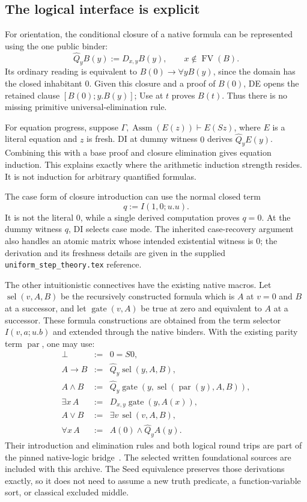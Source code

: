 \documentclass[11pt,letterpaper]{article}
\newcommand{\file}[1]{\nolinkurl{#1}}
\begin{document}
\subsection{The logical interface is explicit}

For orientation, the conditional closure of a native formula can be
represented using the one public binder:
\[
 \widehat Q_y B(y):=D_{x,y}B(y),\qquad x\notin\operatorname{FV}(B).
\]
Its ordinary reading is equivalent to $B(0)\to\forall y B(y)$, since the
domain has the closed inhabitant $0$. Given this closure and a proof of
$B(0)$, DE opens the retained clause $[B(0);y.B(y)]$; Use at $t$ proves
$B(t)$. Thus there is no missing primitive universal-elimination rule.

For equation progress, suppose
$\Gamma,\operatorname{Assm}(E(z))\vdash E(Sz)$, where $E$ is a literal
equation and $z$ is fresh. DI at dummy witness $0$ derives
$\widehat Q_y E(y)$. Combining this with a base proof and closure
elimination gives equation induction. This explains exactly where the
arithmetic induction strength resides. It is not induction for arbitrary
quantified formulas.

The case form of closure introduction can use the normal closed term
\[
 q:=I(1,0;u.u).
\]
It is not the literal $0$, while a single derived computation proves
$q=0$. At the dummy witness $q$, DI selects case mode. The inherited
case-recovery argument also handles an atomic matrix whose intended
existential witness is $0$; the derivation and its freshness details are
given in the supplied \file{uniform_step_theory.tex} reference.

The other intuitionistic connectives have the existing native macros.
Let $\operatorname{sel}(v,A,B)$ be the recursively constructed formula
which is $A$ at $v=0$ and $B$ at a successor, and let
$\operatorname{gate}(v,A)$ be true at zero and equivalent to $A$ at a
successor. These formula constructions are obtained from the term
selector $I(v,a;u.b)$ and extended through the native binders. With the
existing parity term $\operatorname{par}$, one may use:
\[
\begin{array}{rcl}
 \bot&:=&0=S0,\\
 A\to B&:=&\widehat Q_y\operatorname{sel}(y,A,B),\\
 A\land B&:=&\widehat Q_y\operatorname{gate}
                  (y,\operatorname{sel}(\operatorname{par}(y),A,B)),\\
 \exists x\,A&:=&D_{x,y}\operatorname{gate}(y,A(x)),\\
 A\lor B&:=&\exists v\,\operatorname{sel}(v,A,B),\\
 \forall x\,A&:=&A(0)\land\widehat Q_y A(y).
\end{array}
\]
Their introduction and elimination rules and both logical round trips
are part of the pinned native-logic bridge~\cite{baseline,bridge}. The
selected written foundational sources are included with this archive.
The Seed equivalence preserves those derivations exactly, so it does not
need to assume a new truth predicate, a function-variable sort, or
classical excluded middle.
\end{document}

